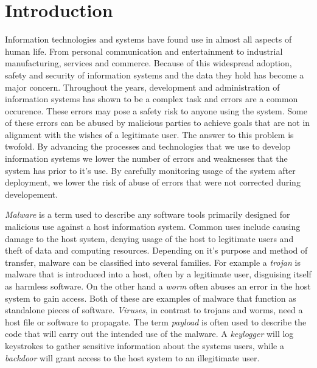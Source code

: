 

\chapter{Introduction}
Information technologies and systems have found use in almost all aspects of human life. From personal communication and entertainment to industrial manufacturing, services and commerce. Because of this widespread adoption, safety and security of information systems and the data they hold has become a major concern. Throughout the years, development and administration of information systems has shown to be a complex task and errors are a common occurence. These errors may pose a safety risk to anyone using the system. Some of these errors can be abused by malicious parties to achieve goals that are not in alignment with the wishes of a legitimate user. The answer to this problem is twofold. By advancing the processes and technologies that we use to develop information systems we lower the number of errors and weaknesses that the system has prior to it's use. By carefully monitoring usage of the system after deployment, we lower the risk of abuse of errors that were not corrected during developement.

\emph{Malware} is a term used to describe any software tools primarily designed for malicious use against a host information system. Common uses include causing damage to the host system, denying usage of the host to legitimate users and theft of data and computing resources. Depending on it's purpose and method of transfer, malware can be classified into several families. For example a \emph{trojan} is malware that is introduced into a host, often by a legitimate user, disguising itself as harmless software. On the other hand a \emph{worm} often abuses an error in the host system to gain access. Both of these are examples of malware that function as standalone pieces of software. \emph{Viruses}, in contrast to trojans and worms, need a host file or software to propagate. The term \emph{payload} is often used to describe the code that will carry out the intended use of the malware. A \emph{keylogger} will log keystrokes to gather sensitive information about the systems users, while a \emph{backdoor} will grant access to the host system to an illegitimate user.

